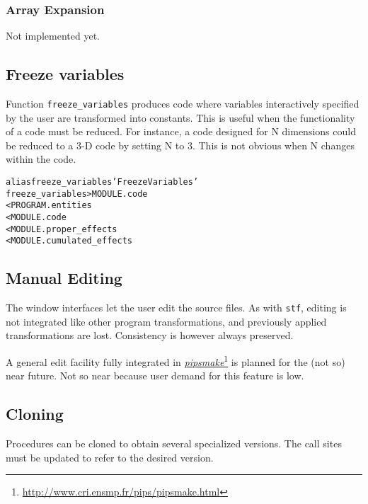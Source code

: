 \documentclass[a4paper]{report}
\newenvironment{PipsMake}{\begin{alltt}}{\end{alltt}}
\newcommand{\LINK}[2]{\href{#2}{#1}\footnote{\url{#2}}\xspace}
\newcommand{\PIPSMAKE}{\LINK{\emph{pipsmake}}{http://www.cri.ensmp.fr/pips/pipsmake.html}\xspace}
\begin{document}
\subsubsection{Array Expansion}

Not implemented yet.

\subsection{Freeze variables}
\label{subsection-freeze-variables}

Function \verb+freeze_variables+ produces code where variables
interactively specified by the user are transformed into
constants. This is useful when the functionality of a code must be
reduced. For instance, a code designed for N dimensions could be
reduced to a 3-D code by setting N to 3. This is not obvious when N
changes within the code. 

\begin{PipsMake}
alias freeze_variables 'Freeze Variables'
freeze_variables                   > MODULE.code
        < PROGRAM.entities
        < MODULE.code
        < MODULE.proper_effects
        < MODULE.cumulated_effects
\end{PipsMake}

\subsection{Manual Editing}

The window interfaces let the user edit the source files. As with
\texttt{stf}, editing is not integrated like other program
transformations, and previously applied transformations are lost.
Consistency is however always preserved.

A general edit facility fully integrated in \PIPSMAKE{} is planned
for the (not so) near future. Not so near because user demand for this
feature is low.


\subsection{Cloning}

Procedures can be cloned to obtain several specialized versions. The
call sites must be updated to refer to the desired version.
\end{document}
